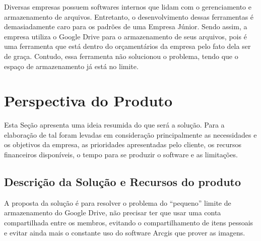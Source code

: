   Diversas empresas possuem softwares internos que lidam com o gerenciamento e armazenamento de arquivos. Entretanto, o desenvolvimento dessas
  ferramentas é demasiadamente caro para os padrões de uma Empresa Júnior. Sendo assim, a empresa utiliza o Google Drive para o armazenamento de
  seus arquivos, pois é uma ferramenta que está dentro do orçamentários da empresa pelo fato dela ser de graça. Contudo, essa ferramenta não
  solucionou o problema, tendo que o espaço de armazenamento já está no limite.

\section{Perspectiva do Produto}

  Esta Seção apresenta uma ideia resumida do que será a solução. Para a elaboração de tal foram levadas em consideração principalmente as
  necessidades e os objetivos da empresa, as prioridades apresentadas pelo cliente, os recursos financeiros disponíveis, o tempo para se
  produzir o software e as limitações.

\subsection{Descrição da Solução e Recursos do produto}

  A proposta da solução é para resolver o problema do “pequeno” limite de armazenamento do Google Drive, não precisar ter que usar uma conta
  compartilhada entre os membros, evitando o compartilhamento de itens pessoais e evitar ainda mais o constante uso do software Arcgis que
  prover as imagens.

